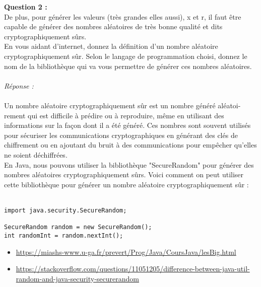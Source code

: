 \documentclass[a4paper,11pt]{article}
\begin{document}
        \label{subsec:Q2}
        \textbf{Question 2 : \\}De plus, pour générer les valeurs (très grandes elles aussi), x et r, il faut être capable de générer des nombres aléatoires de très bonne qualité et dits cryptographiquement sûrs.\\En vous aidant d’internet, donnez la définition d’un nombre aléatoire cryptographiquement sûr. Selon le langage de programmation choisi, donnez le nom de la bibliothèque qui va vous permettre de générer ces nombres aléatoires.\\ \textit{\\Réponse :}\\\\Un nombre aléatoire cryptographiquement sûr est un nombre généré aléatoi-\\rement qui est difficile à prédire ou à reproduire, même en utilisant des informations sur la façon dont il a été généré. Ces nombres sont souvent utilisés pour sécuriser les communications cryptographiques en générant des clés de chiffrement ou en ajoutant du bruit à des communications pour empêcher qu'elles ne soient déchiffrées.\\
En Java, nous pouvons utiliser la bibliothèque "SecureRandom" pour générer des nombres aléatoires cryptographiquement sûrs. Voici comment on peut utiliser cette bibliothèque pour générer un nombre aléatoire cryptographiquement sûr :\\\\ \begin{lstlisting}
import java.security.SecureRandom;

SecureRandom random = new SecureRandom();
int randomInt = random.nextInt();

\end{lstlisting}
\begin{itemize}
    \item \url{https://miashs-www.u-ga.fr/prevert/Prog/Java/CoursJava/lesBig.html}
    \item \url{https://stackoverflow.com/questions/11051205/difference-between-java-util-random-and-java-security-securerandom}
\end{itemize}
\end{document}
